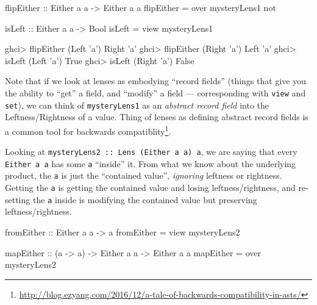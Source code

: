 \documentclass[]{article}
\newenvironment{Shaded}{}{}
\newcommand{\CharTok}[1]{\textcolor[rgb]{0.25,0.44,0.63}{#1}}
\newcommand{\DataTypeTok}[1]{\textcolor[rgb]{0.56,0.13,0.00}{#1}}
\newcommand{\FunctionTok}[1]{\textcolor[rgb]{0.02,0.16,0.49}{#1}}
\newcommand{\NormalTok}[1]{#1}
\newcommand{\OtherTok}[1]{\textcolor[rgb]{0.00,0.44,0.13}{#1}}
\renewcommand{\href}[2]{#2\footnote{\url{#1}}}
\begin{document}
\begin{Shaded}
\begin{Highlighting}[]
\OtherTok{flipEither ::} \DataTypeTok{Either}\NormalTok{ a a }\OtherTok{->} \DataTypeTok{Either}\NormalTok{ a a}
\NormalTok{flipEither }\FunctionTok{=}\NormalTok{ over mysteryLens1 not}

\OtherTok{isLeft ::} \DataTypeTok{Either}\NormalTok{ a a }\OtherTok{->} \DataTypeTok{Bool}
\NormalTok{isLeft }\FunctionTok{=}\NormalTok{ view mysteryLens1}
\end{Highlighting}
\end{Shaded}

\begin{Shaded}
\begin{Highlighting}[]
\NormalTok{ghci}\FunctionTok{>}\NormalTok{ flipEither (}\DataTypeTok{Left} \CharTok{'a'}\NormalTok{)}
\DataTypeTok{Right} \CharTok{'a'}
\NormalTok{ghci}\FunctionTok{>}\NormalTok{ flipEither (}\DataTypeTok{Right} \CharTok{'a'}\NormalTok{)}
\DataTypeTok{Left} \CharTok{'a'}
\NormalTok{ghci}\FunctionTok{>}\NormalTok{ isLeft (}\DataTypeTok{Left} \CharTok{'a'}\NormalTok{)}
\DataTypeTok{True}
\NormalTok{ghci}\FunctionTok{>}\NormalTok{ isLeft (}\DataTypeTok{Right} \CharTok{'a'}\NormalTok{)}
\DataTypeTok{False}
\end{Highlighting}
\end{Shaded}

Note that if we look at lenses as embodying ``record fields'' (things that give
you the ability to ``get'' a field, and ``modify'' a field --- corresponding
with \texttt{view} and \texttt{set}), we can think of \texttt{mysteryLens1} as
an \emph{abstract record field} into the Leftness/Rightness of a value. Thing of
lenses as defining abstract record fields is a
\href{http://blog.ezyang.com/2016/12/a-tale-of-backwards-compatibility-in-asts/}{common
tool for backwards compatiblity}.

Looking at \texttt{mysteryLens2\ ::\ Lens\textquotesingle{}\ (Either\ a\ a)\ a},
we are saying that every \texttt{Either\ a\ a} has some \texttt{a} ``inside''
it. From what we know about the underlying product, the \texttt{a} is just the
``contained value'', \emph{ignoring} leftness or rightness. Getting the
\texttt{a} is getting the contained value and losing leftness/rightness, and
re-setting the \texttt{a} inside is modifying the contained value but preserving
leftness/rightness.

\begin{Shaded}
\begin{Highlighting}[]
\OtherTok{fromEither ::} \DataTypeTok{Either}\NormalTok{ a a }\OtherTok{->}\NormalTok{ a}
\NormalTok{fromEither }\FunctionTok{=}\NormalTok{ view mysteryLens2}

\OtherTok{mapEither ::}\NormalTok{ (a }\OtherTok{->}\NormalTok{ a) }\OtherTok{->} \DataTypeTok{Either}\NormalTok{ a a }\OtherTok{->} \DataTypeTok{Either}\NormalTok{ a a}
\NormalTok{mapEither }\FunctionTok{=}\NormalTok{ over mysteryLens2}
\end{Highlighting}
\end{Shaded}
\end{document}

